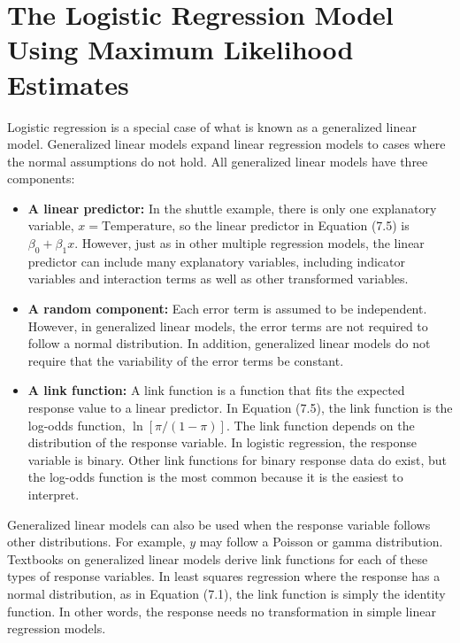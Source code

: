 \documentclass[
]{report}
\begin{document}
\section{\texorpdfstring{\textbf{The Logistic Regression Model Using Maximum Likelihood Estimates}}{The Logistic Regression Model Using Maximum Likelihood Estimates}}\label{the-logistic-regression-model-using-maximum-likelihood-estimates-1}

Logistic regression is a special case of what is known as a generalized linear model. Generalized linear models expand linear regression models to cases where the normal assumptions do not hold. All generalized linear models have three components:

\begin{itemize}
  \item \textbf{A linear predictor:} In the shuttle example, there is only one explanatory variable, $x = \text{Temperature}$, so the linear predictor in Equation (7.5) is $\beta_0 + \beta_1 x$. However, just as in other multiple regression models, the linear predictor can include many explanatory variables, including indicator variables and interaction terms as well as other transformed variables.
  \item \textbf{A random component:} Each error term is assumed to be independent. However, in generalized linear models, the error terms are not required to follow a normal distribution. In addition, generalized linear models do not require that the variability of the error terms be constant.
  \item \textbf{A link function:} A link function is a function that fits the expected response value to a linear predictor. In Equation (7.5), the link function is the log-odds function, $\ln[\pi/(1 - \pi)]$. The link function depends on the distribution of the response variable. In logistic regression, the response variable is binary. Other link functions for binary response data do exist, but the log-odds function is the most common because it is the easiest to interpret.
\end{itemize}

Generalized linear models can also be used when the response variable follows other distributions. For example, \(y\) may follow a Poisson or gamma distribution. Textbooks on generalized linear models derive link functions for each of these types of response variables. In least squares regression where the response has a normal distribution, as in Equation (7.1), the link function is simply the identity function. In other words, the response needs no transformation in simple linear regression models.
\end{document}
